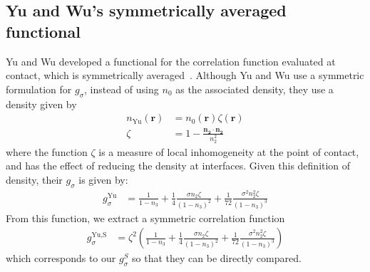 \documentclass[letterpaper,twocolumn,amsmath,amssymb,jcp,10pt,aip]{revtex4-1}
\newcommand{\red}[1]{{\bf \color{red} #1}}
\newcommand{\rr}{\textbf{r}}
\newcommand{\fixme}[1]{\red{[#1]}}
\begin{document}
\subsection{Yu and Wu's symmetrically averaged functional}\label{sec:yuwu}

Yu and Wu developed a functional for the correlation function
evaluated at contact, which is symmetrically
averaged~\cite{yu2002fmt-dft-inhomogeneous-associating}.  Although Yu
and Wu use a symmetric formulation for $g_\sigma$, instead of using
$n_0$ as the associated density, they use a density given by
\begin{align}
  n_\text{Yu}(\rr) &= n_0(\rr) \zeta(\rr) \\
  \zeta &= 1 - \frac{\mathbf{n_2}\cdot\mathbf{n_2}}{n_2^2}
\end{align}
where the function $\zeta$ is a measure of local inhomogeneity at the
point of contact, and has the effect of reducing the density at
interfaces.  Given this definition of density, their $g_\sigma$ is
given by:
\begin{align}
  g_\sigma^\text{Yu} &= \frac{1}{1-n_3}
    + \frac14 \frac{\sigma n_2\zeta}{(1-n_3)^2}
    + \frac1{72} \frac{\sigma^2 n_2^2 \zeta}{(1-n_3)^3}
\end{align}
From this function, we extract a symmetric correlation function
\begin{align}
  g_\sigma^\text{Yu,S} &= \zeta^2\left(\frac{1}{1-n_3}
    + \frac14 \frac{\sigma n_2\zeta}{(1-n_3)^2}
    + \frac1{72} \frac{\sigma^2 n_2^2 \zeta}{(1-n_3)^3}\right)
\end{align}
which corresponds to our $g_\sigma^S$ so that they can be directly
compared.


\end{document}
